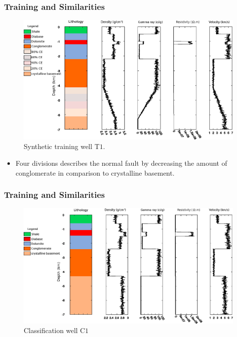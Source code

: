 \documentclass[aspectratio=10]{beamer} %
\begin{document}
\begin{frame}
	\frametitle{Training and Similarities}
	\begin{figure}[H]
		\centering
		\includegraphics[scale=0.34]{Imagens/Pocot1.eps}
		\caption{Synthetic training well T$1$.}
		\label{T1}
	\end{figure}
\pause
\begin{itemize}\footnotesize
	\item Four divisions describes the normal fault by decreasing the amount of conglomerate in comparison to crystalline basement.
\end{itemize}

\end{frame}

\begin{frame}
\frametitle{Training and Similarities}
\begin{figure}[H]
	\centering
	\includegraphics[scale=0.39]{Imagens/Pococ1.eps}
	\caption{Classification well C$1$}
	\label{C1}
\end{figure}
\end{frame}
\end{document}
